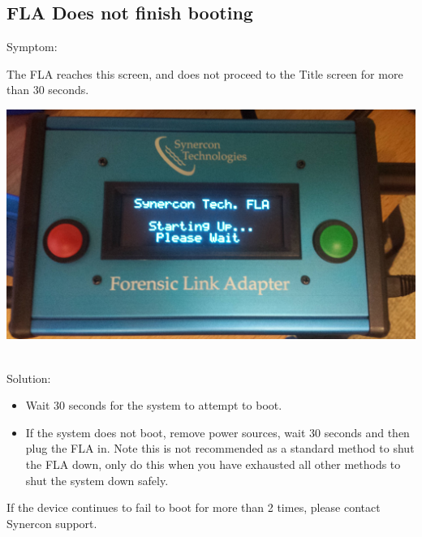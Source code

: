 \documentclass[11pt]{article}
\begin{document}
\subsection{FLA Does not finish booting}
Symptom:\\
\noindent\begin{minipage}{0.45\textwidth}%
The FLA reaches this screen, and does not proceed to the Title screen for more than 30 seconds.
\end{minipage}%
\hfill%
\begin{minipage}{0.45\textwidth}
\includegraphics[width=\linewidth]{./fla_screens/boot_wait}
\end{minipage}\\
Solution:\\
\begin{itemize}
\item Wait 30 seconds for the system to attempt to boot.
\item If the system does not boot, remove power sources, wait 30 seconds and then plug the FLA in. Note this is not recommended as a standard method to shut the FLA down, only do this when you have exhausted all other methods to shut the system down safely.
\end{itemize}
If the device continues to fail to boot for more than 2 times, please contact Synercon support.
\end{document}
